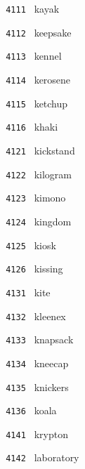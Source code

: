 \documentclass[11pt]{article}
\begin{document}
\begin{multicols}{6}
\small
\noindent \texttt{ 4111 } \hspace{1mm} kayak  \par
\noindent \texttt{ 4112 } \hspace{1mm} keepsake  \par
\noindent \texttt{ 4113 } \hspace{1mm} kennel  \par
\noindent \texttt{ 4114 } \hspace{1mm} kerosene  \par
\noindent \texttt{ 4115 } \hspace{1mm} ketchup  \par
\noindent \texttt{ 4116 } \hspace{1mm} khaki  \par
\noindent \texttt{ 4121 } \hspace{1mm} kickstand  \par
\noindent \texttt{ 4122 } \hspace{1mm} kilogram  \par
\noindent \texttt{ 4123 } \hspace{1mm} kimono  \par
\noindent \texttt{ 4124 } \hspace{1mm} kingdom  \par
\noindent \texttt{ 4125 } \hspace{1mm} kiosk  \par
\noindent \texttt{ 4126 } \hspace{1mm} kissing  \par
\noindent \texttt{ 4131 } \hspace{1mm} kite  \par
\noindent \texttt{ 4132 } \hspace{1mm} kleenex  \par
\noindent \texttt{ 4133 } \hspace{1mm} knapsack  \par
\noindent \texttt{ 4134 } \hspace{1mm} kneecap  \par
\noindent \texttt{ 4135 } \hspace{1mm} knickers  \par
\noindent \texttt{ 4136 } \hspace{1mm} koala  \par
\noindent \texttt{ 4141 } \hspace{1mm} krypton  \par
\noindent \texttt{ 4142 } \hspace{1mm} laboratory  \par

\end{multicols}
\end{document}
